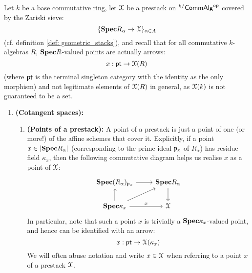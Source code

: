             \begin{definition} \label{def: zariski_tangent_spaces_alt_def}  
                Let $k$ be a base commutative ring, let $\mathcal{X}$ be a prestack on ${}^{k/}\mathsf{Comm}\mathsf{Alg}^{\mathrm{op}}$ covered by the Zariski sieve:
                    $$\{\mathbf{Spec} R_{\alpha} \to \mathcal{X}\}_{\alpha \in A}$$
                (cf. definition \ref{def: geometric_stacks}), and recall that for all commutative $k$-algebras $R$, $\mathbf{Spec} R$-valued points  are actually arrows:
                    $$x: \mathsf{pt} \to \mathcal{X}(R)$$
                (where $\mathsf{pt}$ is the terminal singleton category with the identity as the only morphism) and not legitimate elements of $\mathcal{X}(R)$ in general, as $\mathcal{X}(k)$ is not guaranteed to be a set. 
                    \begin{enumerate}
                        \item \textbf{(Cotangent spaces):}
                            \begin{enumerate}
                                \item \textbf{(Points of a prestack):} A point of a prestack is just a point of one (or more!) of the affine schemes that cover it. Explicitly, if a point $x \in |\mathbf{Spec} R_{\alpha}|$ (corresponding to the prime ideal $\mathfrak{p}_x$ of $R_{\alpha}$) has residue field $\kappa_x$, then the following commutative diagram helps us realise $x$ as a point of $\mathcal{X}$:
                                    $$
                                        \begin{tikzcd}
                                        	{\Spec (R_{\alpha})_{\p_x}} & {\Spec R_{\alpha}} \\
                                        	{\Spec \kappa_x} & \calX
                                        	\arrow[from=1-2, to=2-2]
                                        	\arrow["x", from=2-1, to=2-2]
                                        	\arrow[from=2-1, to=1-1]
                                        	\arrow[from=1-1, to=1-2]
                                        	\arrow[from=2-1, to=1-2]
                                        \end{tikzcd}
                                    $$
                                In particular, note that such a point $x$ is trivially a $\mathbf{Spec} \kappa_x$-valued point, and hence can be identified with an arrow:
                                    $$x: \mathsf{pt} \to \mathcal{X}(\kappa_x)$$
                                We will often abuse notation and write $x \in \mathcal{X}$ when referring to a point $x$ of a prestack $\mathcal{X}$. 

\end{enumerate}
\end{enumerate}
\end{definition}
